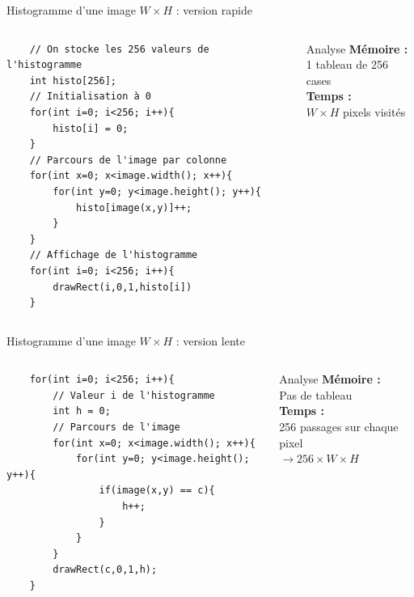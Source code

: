 \documentclass{beamer}
\begin{document}
\begin{frame}[fragile]{Histogramme d'une image $W\times{H}$ : version rapide}
\begin{columns}
    \begin{column}{0.6\textwidth}
    \begin{verbatim}
    // On stocke les 256 valeurs de l'histogramme 
    int histo[256];
    // Initialisation à 0
    for(int i=0; i<256; i++){
        histo[i] = 0;
    }
    // Parcours de l'image par colonne
    for(int x=0; x<image.width(); x++){
        for(int y=0; y<image.height(); y++){
            histo[image(x,y)]++;
        }
    }
    // Affichage de l'histogramme
    for(int i=0; i<256; i++){
        drawRect(i,0,1,histo[i])
    }
    \end{verbatim}
    \end{column}
    \begin{column}{0.4\textwidth}
    \begin{block}{Analyse}
        \textbf{Mémoire :}\\
        1 tableau de 256 cases\\
        \textbf{Temps :}\\
        $W\times{H}$ pixels visités
    \end{block}
    \end{column}
\end{columns}
\end{frame}

\begin{frame}[fragile]{Histogramme d'une image $W\times{H}$ : version lente}
\begin{columns}
    \begin{column}{0.65\textwidth}
    \begin{verbatim}
    for(int i=0; i<256; i++){
        // Valeur i de l'histogramme
        int h = 0;
        // Parcours de l'image
        for(int x=0; x<image.width(); x++){
            for(int y=0; y<image.height(); y++){
                if(image(x,y) == c){
                    h++;
                }
            }
        }
        drawRect(c,0,1,h);
    }
    \end{verbatim}
    \end{column}
    \begin{column}{0.35\textwidth}
    \begin{block}{Analyse}
    \textbf{Mémoire :}\\
    Pas de tableau\\
    \textbf{Temps :}\\
    256 passages sur chaque pixel\\
    $\rightarrow 256\times{W}\times{H}$
    \end{block}
    \end{column}
\end{columns}
\end{frame}
\end{document}
